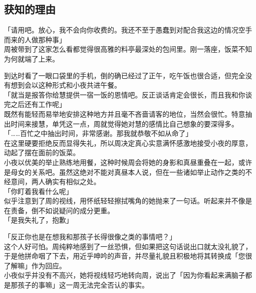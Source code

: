 \subsection{获知的理由}

「请用吧。放心，我不会向你收费的。我还不至于愚蠢到对配合我这边的情况空手而来的人做那种事」\\

周被带到了这家怎么看都觉得很高雅的料亭最深处的包间里。刚一落座，饭菜不知为何就端了上来。

到达时看了一眼口袋里的手机，倒的确已经过了正午，吃午饭也很合适，但完全没有想到会以这种形式和小夜共进午餐。\\

「就当是报答你给慧提供一宿一饭的恩情吧。反正谈话肯定会很长，而且我和你谈完之后还有工作呢」\\

既然有能轻而易举地安排这种地方并且毫不吝啬请客的地位，当然会很忙。特意抽出时间来接慧，单凭这一点，周就觉得她对慧的感情比自己想象的要深得多。\\

「……百忙之中抽出时间，非常感谢。那我就恭敬不如从命了」\\

在这里硬要拒绝反而显得失礼，所以周决定真心实意满怀感激地接受小夜的厚意，动起了摆在面前的饭菜。\\

小夜以优美的举止熟练地用餐，这种时候周会将她的身影和真昼重叠在一起，或许是母女的关系吧。虽然这绝对不能对真昼本人说，但在一些诸如举止动作之类的不经意间，两人确实有相似之处。\\

「你盯着我看什么呢」\\

似乎注意到了周的视线，用怀纸轻轻擦拭嘴角的她抛来了一句话。听起来并不像是在责备，倒不如说疑问的成分更重。\\

「是我失礼了，抱歉」

「反正你也是在想我和那孩子长得很像之类的事情吧？」\\

这个人好可怕。周纯粹地感到了一丝恐惧，但如果把这句话说出口就太没礼貌了，于是他拼命咽了下去，用近乎呻吟的声音，并尽量礼貌且积极地将其转换成「您很了解嘛」作为回应。\\

小夜似乎并没有不高兴，她将视线轻巧地转向周，说出了「因为你看起来满脑子都是那孩子的事嘛」这一周无法完全否认的事实。\\

